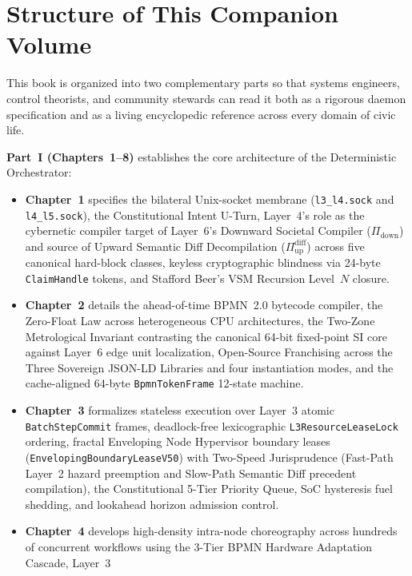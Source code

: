 \section*{Structure of This Companion Volume}

This book is organized into two complementary parts so that systems engineers, control
theorists, and community stewards can read it both as a rigorous daemon specification and as
a living encyclopedic reference across every domain of civic life.

\textbf{Part~I (Chapters~1--8)} establishes the core architecture of the Deterministic Orchestrator:
\begin{itemize}
\item \textbf{Chapter~1} specifies the bilateral Unix-socket membrane (\texttt{l3\_l4.sock}
        and \texttt{l4\_l5.sock}), the Constitutional Intent U-Turn, Layer~4's role as the
        cybernetic compiler target of Layer~6's Downward Societal Compiler
        ($\Pi_{\mathrm{down}}$) and source of Upward Semantic Diff Decompilation
        ($\Pi_{\mathrm{up}}^{\mathrm{diff}}$) across five canonical hard-block classes,
        keyless cryptographic blindness via 24-byte \texttt{ClaimHandle} tokens, and Stafford
        Beer's VSM Recursion Level~$N$ closure.
\item \textbf{Chapter~2} details the ahead-of-time BPMN~2.0 bytecode compiler, the
        Zero-Float Law across heterogeneous CPU architectures, the Two-Zone Metrological
        Invariant contrasting the canonical 64-bit fixed-point SI core against Layer~6 edge
        unit localization, Open-Source Franchising across the Three Sovereign JSON-LD
        Libraries and four instantiation modes, and the cache-aligned 64-byte
        \texttt{BpmnTokenFrame} 12-state machine.
\item \textbf{Chapter~3} formalizes stateless execution over Layer~3 atomic
        \texttt{BatchStepCommit} frames, deadlock-free lexicographic
        \texttt{L3ResourceLeaseLock} ordering, fractal Enveloping Node Hypervisor boundary
        leases (\texttt{EnvelopingBoundaryLeaseV50}) with Two-Speed Jurisprudence (Fast-Path
        Layer~2 hazard preemption and Slow-Path Semantic Diff precedent compilation), the
        Constitutional 5-Tier Priority Queue, SoC hysteresis fuel shedding, and lookahead
        horizon admission control.
\item \textbf{Chapter~4} develops high-density intra-node choreography across hundreds of
        concurrent workflows using the 3-Tier BPMN Hardware Adaptation Cascade, Layer~3

\end{itemize}
